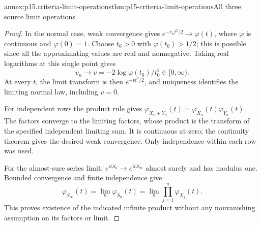 \begin{annexitem}{annex:p15.criteria-limit-operations}{thm:p15-criteria-limit-operations}{All three source limit operations}
\begin{proof}
In the normal case, weak convergence gives
\(e^{-v_nt^2/2}\to\varphi(t)\), where \(\varphi\) is
continuous and \(\varphi(0)=1\).
Choose \(t_0>0\) with \(\varphi(t_0)>1/2\);
this is possible since all the approximating values
are real and nonnegative. Taking real logarithms at
this single point gives
\[
 v_n\longrightarrow v=-2\log\varphi(t_0)/t_0^2
                              \in[0,\infty).
\]
At every \(t\), the limit transform is then
\(e^{-vt^2/2}\), and uniqueness identifies the
limiting normal law, including \(v=0\).

For independent rows the product rule gives
\(\varphi_{X_n+Y_n}(t)=\varphi_{X_n}(t)\varphi_{Y_n}(t)\).
The factors converge to the limiting factors, whose
product is the transform of the specified independent
limiting sum. It is continuous at zero; the continuity
theorem gives the desired weak convergence.
Only independence within each row was used.

For the almost-sure series limit, \(e^{itS_n}\to e^{itS_\infty}\)
almost surely and has modulus one. Bounded convergence
and finite independence give
\[
 \varphi_{S_\infty}(t)=\lim_n\varphi_{S_n}(t)
                      =\lim_n\prod_{j=1}^n\varphi_{X_j}(t).
\]
This proves existence of the indicated infinite product
without any nonvanishing assumption on its factors or limit.
\end{proof}
\end{annexitem}

